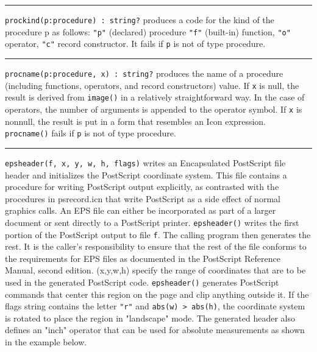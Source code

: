 \vspace{0.25cm}\hrule{}

\texttt{prockind(p:procedure) : string?} produces a code for the kind of
the procedure p as follows: \texttt{"p"}
(declared) procedure \texttt{"f"}
(built-in) function, \texttt{"o"} operator,
\texttt{"c"} record
constructor. It fails if \texttt{p} is not of type
procedure. 

\vspace{0.25cm}\hrule{}

\texttt{procname(p:procedure, x) : string?} produces the name of a
procedure (including functions, operators, and record
constructors) value. If \texttt{x} is null,
the result is derived from \texttt{image()} in a relatively
straightforward way. In the case of operators, the number of arguments
is appended to the operator symbol. If \texttt{x} is nonnull, the
result is put in a form that resembles an Icon expression.
\texttt{procname()} fails if \texttt{p} is not of type procedure. 

\vspace{0.25cm}\hrule{}

\texttt{epsheader(f, x, y, w, h, flags)} writes an Encapsulated
PostScript file header and initializes the PostScript coordinate
system. This file contains a procedure for writing PostScript output
explicitly, as contrasted with the procedures in psrecord.icn that
write PostScript as a side effect of normal graphics calls. An EPS file
can either be incorporated as part of a larger document or sent
directly to a PostScript printer. \texttt{epsheader()} writes the first
portion of the PostScript output to file \texttt{f}. The calling
program then generates the rest. It is the caller's
responsibility to ensure that the rest of the file conforms to the
requirements for EPS files as documented in the PostScript Reference
Manual, second edition. (x,y,w,h) specify the range of coordinates that
are to be used in the generated PostScript code. \texttt{epsheader()}
generates PostScript commands that center this region
on the page and clip anything outside it. If the flags string contains
the letter \texttt{"r"} and \texttt{abs(w)
{\textgreater} abs(h)}, the coordinate system is rotated to place the
region in "landscape" mode. The generated
header also defines an "inch" operator that
can be used for absolute measurements as shown in the example below.


